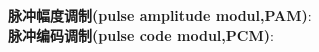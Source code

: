 \documentclass[UTF8,a4paper,10pt]{article}
\begin{document}
\begin{multicols}{2}
    \textbf{脉冲幅度调制(pulse amplitude modul,PAM)}:\\%
    \textbf{脉冲编码调制(pulse code modul,PCM)}:\\
\end{multicols}
\end{document}
